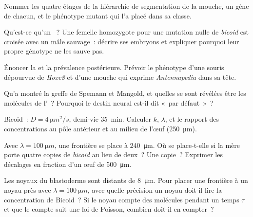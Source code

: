 \begin{exercise}[$\star$]\label{exo:b3:developmental-genetics:1}
Nommer les quatre étages de la hiérarchie de segmentation de la mouche,
un gène de chacun, et le phénotype mutant qui l'a placé dans sa classe.
\end{exercise}

\begin{exercise}[$\star$]\label{exo:b3:developmental-genetics:2}
Qu'est-ce qu'un ~? Une femelle homozygote pour une
mutation nulle de \emph{bicoid} est croisée avec un mâle sauvage~:
décrire ses embryons et expliquer pourquoi leur propre génotype ne les
sauve pas.
\end{exercise}

\begin{exercise}[$\star$]\label{exo:b3:developmental-genetics:3}
Énoncer la  et la prévalence postérieure. Prévoir le
phénotype d'une souris dépourvue de \emph{Hoxc8} et d'une mouche qui
exprime \emph{Antennapedia} dans sa tête.
\end{exercise}

\begin{exercise}[$\star$]\label{exo:b3:developmental-genetics:4}
Qu'a montré la greffe de Spemann et Mangold, et quelles se sont révélées
être les molécules de l'~? Pourquoi le destin neural
est-il dit «~par défaut~»~?
\end{exercise}

\begin{exercise}[$\star\star$]\label{exo:b3:developmental-genetics:5}
Bicoid~: $D = \qty{4}{\micro m^2/s}$, demi-vie \qty{35}{min}. Calculer
$k$, $\lambda$, et le rapport des concentrations au pôle antérieur et au
milieu de l'œuf (\qty{250}{\micro m}).
\end{exercise}

\begin{exercise}[$\star\star$]\label{exo:b3:developmental-genetics:6}
Avec $\lambda = \qty{100}{\micro m}$, une frontière se place à
\qty{240}{\micro m}. Où se place-t-elle si la mère porte quatre copies
de \emph{bicoid} au lieu de deux~? Une copie~? Exprimer les décalages en
fraction d'un œuf de \qty{500}{\micro m}.
\end{exercise}

\begin{exercise}[$\star\star$]\label{exo:b3:developmental-genetics:7}
Les noyaux du blastoderme sont distants de \qty{8}{\micro m}. Pour
placer une frontière à un noyau près avec $\lambda = \qty{100}{\micro m}$,
avec quelle précision un noyau doit-il lire la concentration de Bicoid~?
Si le noyau compte des molécules pendant un temps $\tau$ et que le
compte suit une loi de Poisson, combien doit-il en compter~?
\end{exercise}

